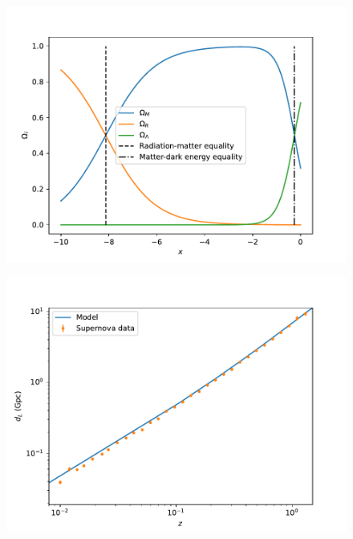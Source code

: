 \documentclass{aa}
\begin{document}
\begin{figure}[ht]
\centering
\includegraphics[width=\hsize]{figures/Omegas.pdf}
  \caption{}
     \label{}
\end{figure}

\begin{figure}[ht]
\centering
\includegraphics[width=\hsize]{figures/dL.pdf}
  \caption{}
     \label{}
\end{figure}
\end{document}
